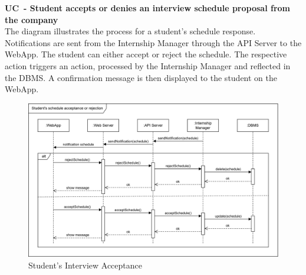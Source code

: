 \textbf{UC\cuc\ - Student accepts or denies an interview schedule proposal from the company} \\
The diagram illustrates the process for a student's schedule response. Notifications are sent from the Internship Manager through the API Server to the WebApp. The student can either accept or reject the schedule. The respective action triggers an action, processed by the Internship Manager and reflected in the DBMS. A confirmation message is then displayed to the student on the WebApp.
\begin{center}
    \begin{figure}[H]
        \centering
        \includegraphics[width=1\linewidth]{Images/Sequence diagrams/UC8.png}
        \caption{Student's Interview Acceptance}
        \label{fig:enter-label}
    \end{figure}
\end{center}

